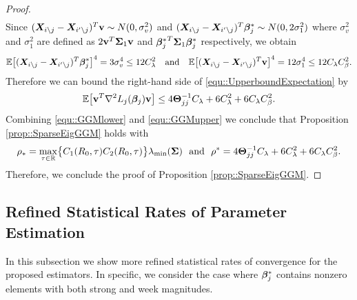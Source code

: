 \documentclass[twoside,11pt]{article}
\newcommand*{\BR}{\mathbb{R}}
\newcommand*{\bbetass}{\bbeta^*_{j}}
\begin{document}
\begin{proof}
\begin{align*}
\end{align*}
Since $(\bm{X}_{i\setminus j} - \bm{X}_{i' \setminus j})^T \mathbf{v} \sim N(0, \sigma_v^2 )$ and $ (\bX_{i\setminus j} - \bX_{i' \setminus j})^T \bbetass \sim N(0,2 \sigma_1^2)$ where $\sigma_v^2 $ and $\sigma_1^2 $ are defined as $2\mathbf{v} ^T \bm{\Sigma}_1 \mathbf{v}$ and ${\bbetass}^T \bSigma_1 \bbetass $ respectively,  we obtain
\begin{align*}
\EE \bigl[ (\bX_{i \setminus j} - \bX_{i' \setminus j})^T \bbetass\bigr ]^4= 3 \sigma_v^4\leq 12 C_\lambda ^2\quad \text{and}\quad \EE \bigl [(\bX_{i\setminus j} - \bX_{i' \setminus j})^T \vb \bigr ]^4 = 12 \sigma_1^4   \leq 12C_\lambda C_\beta^2.
\end{align*}
Therefore we can bound the right-hand side of \eqref{equ::UpperboundExpectation} by 
\begin{align}\label{equ::GGMupper}
\mathbb{E} \bigl[\mathbf{v}^T \nabla^2 L_j(\bm{\beta}_j) \mathbf{v} \bigr ] \leq 4 \bm{\Theta}_{jj} ^{-1}C_\lambda + 6 C_\lambda^2 + 6 C_\lambda C_\beta^2.
\end{align}
Combining \eqref{equ::GGMlower} and \eqref{equ::GGMupper} we conclude that Proposition \ref{prop::SparseEigGGM} holds with $$\rho_* = \max _{\tau\in \BR}\bigl \{ C_1(R_0,\tau) C_2(R_0,\tau)  \bigr\} \lambda_{\min} ( \bSigma)~~\text{and}~~ \rho^* = 4\bTheta_{jj} ^{-1}C_\lambda + 6 C_\lambda^2 + 6 C_\lambda C_\beta^2.$$
Therefore, we conclude the proof of Proposition \ref{prop::SparseEigGGM}.
\end{proof}

\subsection{Refined Statistical Rates of Parameter Estimation}\label{sec::refined_rates}
In this subsection we show  more refined statistical  rates of convergence for the proposed estimators. In specific, we consider the case where $\bm{\beta}_j^*$ contains nonzero elements  with both strong and week magnitudes.
\end{document}
